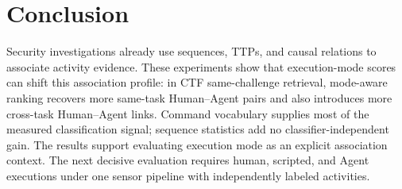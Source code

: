 \section{Conclusion}

Security investigations already use sequences, TTPs, and causal relations to associate activity evidence. These experiments show that execution-mode scores can shift this association profile: in CTF same-challenge retrieval, mode-aware ranking recovers more same-task Human--Agent pairs and also introduces more cross-task Human--Agent links. Command vocabulary supplies most of the measured classification signal; sequence statistics add no classifier-independent gain. The results support evaluating execution mode as an explicit association context. The next decisive evaluation requires human, scripted, and Agent executions under one sensor pipeline with independently labeled activities.
